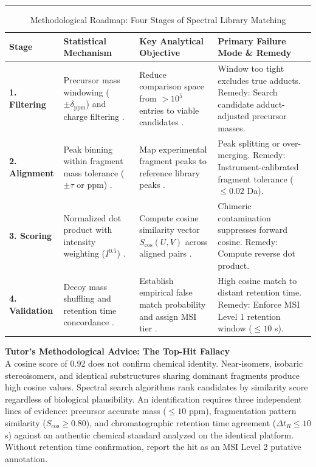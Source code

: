 \documentclass[11pt,twoside,openright]{book}
\begin{document}
\vspace{0.8em}
\noindent\rule{\textwidth}{0.4pt}


\begin{table}[ht]
\centering
\caption{Methodological Roadmap: Four Stages of Spectral Library Matching}
\label{tab:library_roadmap}
\small
\begin{tabularx}{\textwidth}{l p{3.8cm} p{4.2cm} X}
\toprule
\textbf{Stage} & \textbf{Statistical Mechanism} & \textbf{Key Analytical Objective} & \textbf{Primary Failure Mode \& Remedy} \\
\midrule
\textbf{1. Filtering} & Precursor mass windowing ($\pm \delta_{\text{ppm}}$) and charge filtering \cite{wishart2022hmdb}. & Reduce comparison space from $>10^5$ entries to viable candidates \cite{guijas2018metlin}. & Window too tight excludes true adducts. Remedy: Search candidate adduct-adjusted precursor masses. \\
\addlinespace
\textbf{2. Alignment} & Peak binning within fragment mass tolerance ($\pm \tau$ or ppm) \cite{pluskal2010mzmine}. & Map experimental fragment peaks to reference library peaks \cite{tsugawa2015msdial}. & Peak splitting or over-merging. Remedy: Instrument-calibrated fragment tolerance ($\le 0.02$ Da). \\
\addlinespace
\textbf{3. Scoring} & Normalized dot product with intensity weighting ($I^{0.5}$) \cite{stein1994optimization}. & Compute cosine similarity vector $S_{\cos}(U, V)$ across aligned pairs \cite{li2021spectral}. & Chimeric contamination suppresses forward cosine. Remedy: Compute reverse dot product. \\
\addlinespace
\textbf{4. Validation} & Decoy mass shuffling and retention time concordance \cite{scheubert2017significance}. & Establish empirical false match probability and assign MSI tier \cite{sumner2007proposed}. & High cosine match to distant retention time. Remedy: Enforce MSI Level 1 retention window ($\le 10$ s). \\
\bottomrule
\end{tabularx}
\end{table}

\FloatBarrier

\begin{notebox}
\textbf{Tutor's Methodological Advice: The Top-Hit Fallacy}\\
A cosine score of 0.92 does not confirm chemical identity. Near-isomers, isobaric stereoisomers, and identical substructures sharing dominant fragments produce high cosine values. Spectral search algorithms rank candidates by similarity score regardless of biological plausibility. An identification requires three independent lines of evidence: precursor accurate mass ($\le 10$ ppm), fragmentation pattern similarity ($S_{\cos} \ge 0.80$), and chromatographic retention time agreement ($\Delta t_R \le 10$ s) against an authentic chemical standard analyzed on the identical platform. Without retention time confirmation, report the hit as an MSI Level 2 putative annotation.
\end{notebox}
\end{document}

